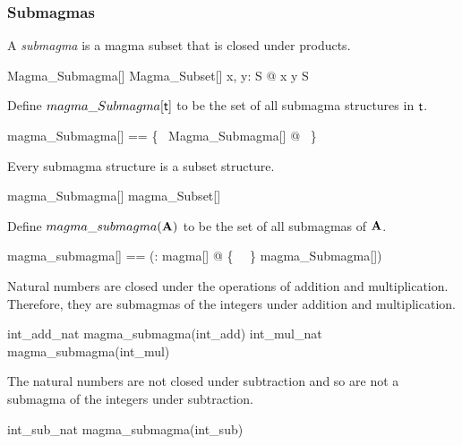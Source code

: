 \documentclass{amsart}
\begin{document}
\subsubsection{Submagmas}

A \textit{submagma} is a magma subset that is closed under products.

\begin{schema}{Magma\_Submagma}[\genT]
	Magma\_Subset[\genT]
\where
	\forall x, y: S @ x \opG y \in S
\end{schema}

Define $magma\_Submagma[\mathsf{t}]$ to be the set of all submagma structures in $\mathsf{t}$.

\begin{zed}
	magma\_Submagma[\genT] == \{~ Magma\_Submagma[\genT] @ \strucS ~\}
\end{zed}

\begin{remark}
Every submagma structure is a subset structure.

\begin{zed}
	magma\_Submagma[\setT] \subseteq magma\_Subset[\setT]
\end{zed}

\end{remark}

Define $magma\_submagma(\mathbf{A})$ to be the set of all submagmas of $\mathbf{A}$.

\begin{zed}
	magma\_submagma[\genT] == (\lambda \strucA: magma[\genT] @ \{~ \strucA ~\} \dres magma\_Submagma[\genT])
\end{zed}

\begin{example}
Natural numbers are closed under the operations of addition and multiplication.
Therefore, they are submagmas of the integers under addition and multiplication.

\begin{zed}
	int\_add\_nat \in magma\_submagma(int\_add)
\also
	int\_mul\_nat \in magma\_submagma(int\_mul)
\end{zed}

\end{example}

\begin{counterexample}
The natural numbers are not closed under subtraction and so are not
a submagma of the integers under subtraction.

\begin{zed}
	int\_sub\_nat \notin magma\_submagma(int\_sub)
\end{zed}

\end{counterexample}
\end{document}
